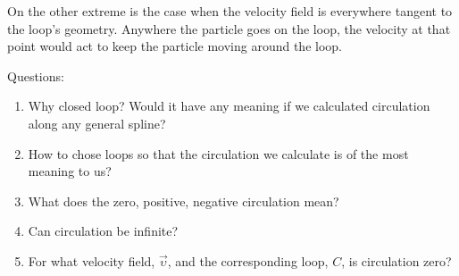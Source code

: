 On the other extreme is the case when the velocity field is everywhere tangent to the loop's geometry. Anywhere the particle goes on the loop, the velocity at that point would act to keep the particle moving around the loop.

Questions:

\begin{enumerate}
\item Why closed loop? Would it have any meaning if we calculated circulation along any general spline?

\item How to chose loops so that the circulation we calculate is of the most meaning to us?

\item What does the zero, positive, negative circulation mean?

\item Can circulation be infinite?

\item For what velocity field, $\vec{\upsilon}$, and the corresponding loop, $C$, is circulation zero?
\end{enumerate}

